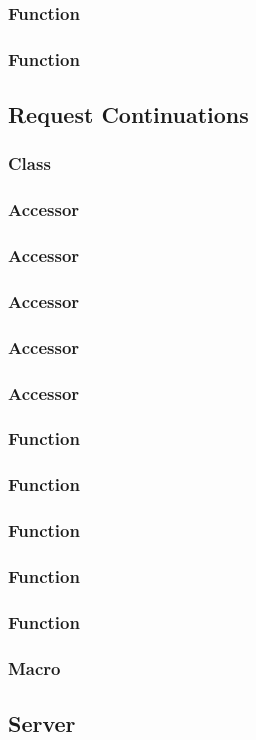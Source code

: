 \subsubsection{Function }
\subsubsection{Function }
\newpage
\subsection{Request Continuations}\label{sec:lib request continuations}
\subsubsection{Class }
\subsubsection{Accessor }
\subsubsection{Accessor }
\subsubsection{Accessor }
\subsubsection{Accessor }
\subsubsection{Accessor }
\subsubsection{Function }
\subsubsection{Function }
\subsubsection{Function }
\subsubsection{Function }
\subsubsection{Function }
\subsubsection{Macro }
\newpage
\subsection{Server}\label{sec:lib server}

